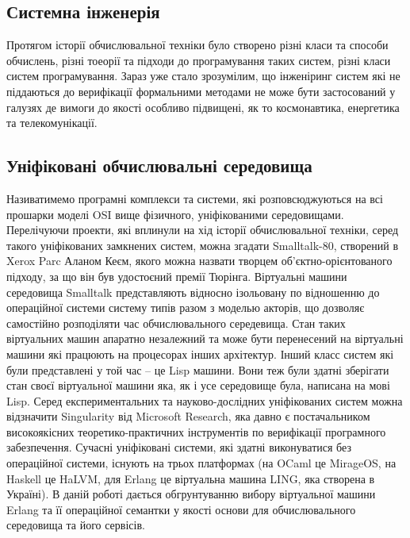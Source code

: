 \documentclass[11pt,oneside]{article}
\begin{document}
\vspace{1cm}


\subsection{Системна інженерія}

   Протягом історії обчислювальної техніки було створено різні класи та способи обчислень,
   різні тоеорії та підходи до програмування таких систем, різні класи систем програмування.
   Зараз уже стало зрозумілим, що інженіринг систем які не піддаються до верифікації
   формальними методами не може бути застосований у галузях де вимоги до якості
   особливо підвищені, як то космонавтика, енергетика та телекомунікації.

\subsection{Уніфіковані обчислювальні середовища}

   Називатимемо програмні комплекси та системи, які розповсюджуються на всі прошарки моделі OSI вище фізичного,
   уніфікованими середовищами. Перелічуючи проекти, які вплинули на хід історії
   обчислювальної техніки, серед такого уніфікованих замкнених систем, можна згадати Smalltalk-80,
   створений в Xerox Parc Аланом Кеєм, якого можна назвати творцем
   об'єктно-орієнтованого підходу, за що він був удостоєний премії Тюрінга.
   Віртуальні машини середовища Smalltalk представляють відносно ізольовану
   по відношенню до операційної системи систему типів разом з моделью акторів, що дозволяє
   самостійно розподіляти час обчислювального середевища. Стан таких віртуальних машин апаратно незалежний
   та може бути перенесений на віртуальні машини які працюють на процесорах інших архітектур.
   Інший класс систем які були представлені у той час -- це Lisp машини. Вони теж були
   здатні зберігати стан своєї віртуальної машини яка,
   як і усе середовище була, написана на мові Lisp. Серед експериментальних та науково-дослідних
   уніфікованих систем можна відзначити Singularity від Microsoft Research, яка давно є постачальником
   високоякісних теоретико-практичних інструментів по верифікації програмного забезпечення.
   Сучасні уніфіковані системи, які здатні виконуватися без операційної системи,
   існують на трьох платформах (на OCaml це MirageOS, на Haskell це HaLVM,
   для Erlang це віртуальна машина LING, яка створена в Україні). В даній роботі дається обгрунтуванню вибору
   віртуальної машини Erlang та її операційної семантки у якості основи для обчислювального
   середовища та його сервісів.
\end{document}
